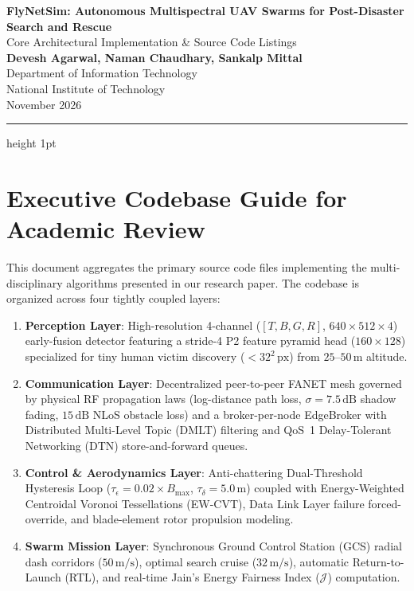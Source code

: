 \documentclass[10pt,a4paper]{article}
\begin{document}
\begin{center}
    {\huge\sffamily\bfseries FlyNetSim: Autonomous Multispectral UAV Swarms for Post-Disaster Search and Rescue}\\[8pt]
    {\Large\sffamily\color{gray!80!black} Core Architectural Implementation \& Source Code Listings}\\[12pt]
    
    {\large\bfseries Devesh Agarwal, Naman Chaudhary, Sankalp Mittal}\\[4pt]
    {\normalsize Department of Information Technology}\\
    {\normalsize National Institute of Technology}\\[8pt]
    {\small November 2026}
\end{center}

\vspace{8pt}
\hrule height 1pt
\vspace{12pt}

\section*{Executive Codebase Guide for Academic Review}
This document aggregates the primary source code files implementing the multi-disciplinary algorithms presented in our research paper. The codebase is organized across four tightly coupled layers:
\begin{enumerate}
    \item \textbf{Perception Layer}: High-resolution 4-channel ($[T, B, G, R]$, $640 \times 512 \times 4$) early-fusion detector featuring a stride-4 P2 feature pyramid head ($160 \times 128$) specialized for tiny human victim discovery ($<32^2\,\text{px}$) from $25\text{--}50\,\text{m}$ altitude.
    \item \textbf{Communication Layer}: Decentralized peer-to-peer FANET mesh governed by physical RF propagation laws (log-distance path loss, $\sigma = 7.5\,\text{dB}$ shadow fading, $15\,\text{dB}$ NLoS obstacle loss) and a broker-per-node EdgeBroker with Distributed Multi-Level Topic (DMLT) filtering and QoS~1 Delay-Tolerant Networking (DTN) store-and-forward queues.
    \item \textbf{Control \& Aerodynamics Layer}: Anti-chattering Dual-Threshold Hysteresis Loop ($\tau_\epsilon = 0.02 \times B_{\text{max}}$, $\tau_\delta = 5.0\,\text{m}$) coupled with Energy-Weighted Centroidal Voronoi Tessellations (EW-CVT), Data Link Layer failure forced-override, and blade-element rotor propulsion modeling.
    \item \textbf{Swarm Mission Layer}: Synchronous Ground Control Station (GCS) radial dash corridors ($50\,\text{m/s}$), optimal search cruise ($32\,\text{m/s}$), automatic Return-to-Launch (RTL), and real-time Jain's Energy Fairness Index ($\mathcal{J}$) computation.
\end{enumerate}
\end{document}
